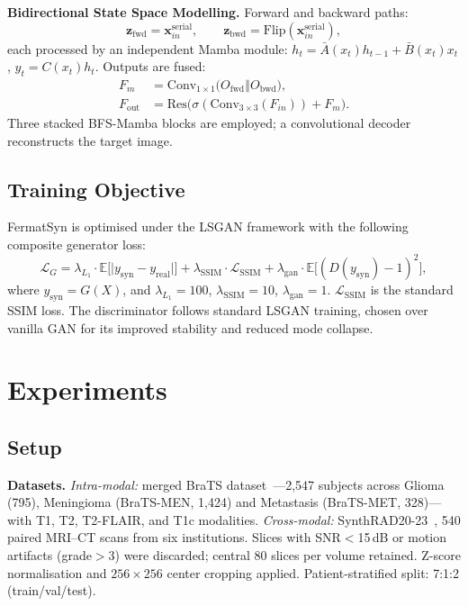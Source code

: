 \documentclass[runningheads]{llncs}
\begin{document}
\noindent\textbf{Bidirectional State Space Modelling.}
Forward and backward paths:
\begin{equation}
  \mathbf{z}_{\mathrm{fwd}} = \mathbf{x}^{\mathrm{serial}}_{in},\qquad
  \mathbf{z}_{\mathrm{bwd}} = \mathrm{Flip}(\mathbf{x}^{\mathrm{serial}}_{in}),
  \label{eq:bidir}
\end{equation}
each processed by an independent Mamba module:
$h_t=\bar{A}(x_t)h_{t-1}+\bar{B}(x_t)x_t$, $y_t=C(x_t)h_t$.
Outputs are fused:
\begin{align}
  F_m &= \mathrm{Conv}_{1\times1}\!\bigl(O_{\mathrm{fwd}}\mathbin\Vert O_{\mathrm{bwd}}\bigr), \label{eq:fm} \\
  F_{\mathrm{out}} &= \mathrm{Res}\!\bigl(\sigma(\mathrm{Conv}_{3\times3}(F_{in})) + F_m\bigr). \label{eq:fout}
\end{align}
Three stacked BFS-Mamba blocks are employed; a convolutional decoder
reconstructs the target image.

\subsection{Training Objective}
\label{sec:loss}

FermatSyn is optimised under the LSGAN framework
with the following composite generator loss:
\begin{equation}
  \mathcal{L}_G = \lambda_{L_1}\!\cdot\!\mathbb{E}\bigl[
    \lvert y_{\text{syn}}{-}y_{\text{real}}\rvert\bigr]
    + \lambda_{\text{SSIM}}\!\cdot\!\mathcal{L}_{\text{SSIM}}
    + \lambda_{\text{gan}}\!\cdot\!\mathbb{E}\bigl[
    (D(y_{\text{syn}}){-}1)^2\bigr],
  \label{eq:lg}
\end{equation}
where $y_{\text{syn}}{=}G(X)$, and
$\lambda_{L_1}{=}100$, $\lambda_{\text{SSIM}}{=}10$,
$\lambda_{\text{gan}}{=}1$.
$\mathcal{L}_{\text{SSIM}}$ is the standard SSIM loss.
The discriminator follows standard LSGAN training,
chosen over vanilla GAN for its improved stability and reduced mode
collapse.


\section{Experiments}
\label{sec:exp}

\subsection{Setup}

\noindent\textbf{Datasets.}
\emph{Intra-modal:} merged BraTS
dataset~\cite{menze2015multimodal,baid2021rsna}---2,547 subjects
across Glioma (795), Meningioma (BraTS-MEN,
1,424) and Metastasis (BraTS-MET, 328)---with T1, T2, T2-FLAIR, and T1c
modalities.
\emph{Cross-modal:} SynthRAD20-23~\cite{synthrad2023}, 540 paired
MRI--CT scans from six institutions.
Slices with SNR${<}$15\,dB or motion artifacts (grade${>}$3) were
discarded; central 80 slices per volume retained.
Z-score normalisation and $256{\times}256$ center cropping applied.
Patient-stratified split: 7:1:2 (train/val/test).
\end{document}
